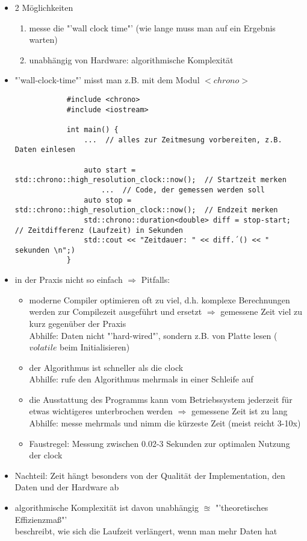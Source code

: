 \documentclass{article}
\begin{document}
	\begin{itemize}
		\item 2 Möglichkeiten
		\begin{enumerate}
			\item messe die "'wall clock time"' (wie lange muss man auf ein Ergebnis warten)
			\item unabhängig von Hardware: algorithmische Komplexität
		\end{enumerate}
		\item "'wall-clock-time"' misst man z.B. mit dem Modul $<chrono>$
		\begin{lstlisting}
			#include <chrono>
			#include <iostream>
			
			int main() {
				...  // alles zur Zeitmesung vorbereiten, z.B. Daten einlesen
				
				auto start = std::chrono::high_resolution_clock::now();  // Startzeit merken
					...  // Code, der gemessen werden soll
				auto stop = std::chrono::high_resolution_clock::now();  // Endzeit merken
				std::chrono::duration<double> diff = stop-start;  // Zeitdifferenz (Laufzeit) in Sekunden
				std::cout << "Zeitdauer: " << diff.´() << " sekunden \n";)
			}
		\end{lstlisting}
		\item in der Praxis nicht so einfach $\Rightarrow$ Pitfalls:
		\begin{itemize}
			\item moderne Compiler optimieren oft zu viel, d.h. komplexe Berechnungen werden zur Compilezeit ausgeführt und ersetzt $\Rightarrow$ gemessene Zeit viel zu kurz gegenüber der Praxis \\
			Abhilfe: Daten nicht "'hard-wired"', sondern z.B. von Platte lesen ($volatile$ beim Initialisieren)
			\item der Algorithmus ist schneller als die clock  \\
			Abhilfe: rufe den Algorithmus mehrmals in einer Schleife auf
		\item die Ausstattung des Programms kann vom Betriebssystem jederzeit für etwas wichtigeres unterbrochen werden $\Rightarrow$ gemessene Zeit ist zu lang \\
		Abhilfe: messe mehrmals und nimm die kürzeste Zeit (meist reicht 3-10x)
		\item Faustregel: Messung zwischen 0.02-3 Sekunden zur optimalen Nutzung der clock
		\end{itemize}
		\item Nachteil: Zeit hängt besonders von der Qualität der Implementation, den Daten und der Hardware ab
		\item algorithmische Komplexität ist davon unabhängig $\approxeq$ "'theoretisches Effizienzmaß"' \\
		beschreibt, wie sich die Laufzeit verlängert, wenn man mehr Daten hat \\
		

\end{itemize}
\end{document}
